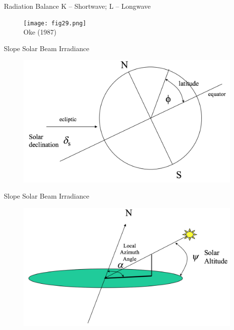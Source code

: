 \begin{frame}{Radiation Balance}
K – Shortwave; L – Longwave
\begin{figure}
	\texttt{[image: fig29.png]}
	\centering \tiny~\\Oke (1987)
\end{figure}
\end{frame}


\begin{frame}{Slope Solar Beam Irradiance}
\begin{figure}
	\includegraphics[width=\textwidth]{fig30.png}
\end{figure}
\end{frame}


\begin{frame}{Slope Solar Beam Irradiance}
\begin{figure}
	\includegraphics[width=\textwidth]{fig31.png}
\end{figure}
\end{frame}

